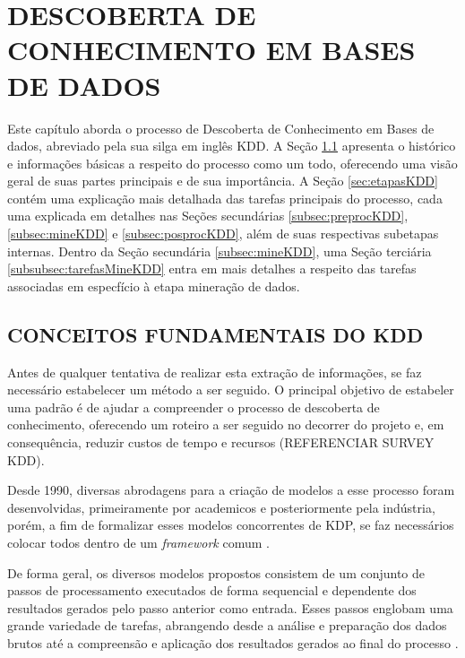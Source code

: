 
%

\chapter{DESCOBERTA DE CONHECIMENTO EM BASES DE DADOS}
\label{chap:descobertaConhecimento}
Este capítulo aborda o processo de Descoberta de Conhecimento em Bases de dados, abreviado pela sua silga em inglês KDD. A Seção \ref{sec:conceitosKDD} apresenta o histórico e informações básicas a respeito do processo como um todo, oferecendo uma visão geral de suas partes principais e de sua importância. A Seção \ref{sec:etapasKDD} contém uma explicação mais detalhada das tarefas principais do processo, cada uma explicada em detalhes nas Seções secundárias \ref{subsec:preprocKDD}, \ref{subsec:mineKDD} e \ref{subsec:posprocKDD}, além de suas respectivas subetapas internas. Dentro da Seção secundária \ref{subsec:mineKDD}, uma Seção terciária \ref{subsubsec:tarefasMineKDD} entra em mais detalhes a respeito das tarefas associadas em especfício à etapa mineração de dados.

\section{CONCEITOS FUNDAMENTAIS DO KDD}
\label{sec:conceitosKDD}

Antes de qualquer tentativa de realizar esta extração de informações, se faz necessário estabelecer um método a ser seguido. O principal objetivo de estabeler uma padrão é de ajudar a compreender o processo de descoberta de conhecimento, oferecendo um roteiro a ser seguido no decorrer do projeto e, em consequência, reduzir custos de tempo e recursos (REFERENCIAR SURVEY KDD).

Desde 1990, diversas abrodagens para a criação de modelos a esse processo foram desenvolvidas, primeiramente por academicos e posteriormente pela indústria, porém, a fim de formalizar esses modelos concorrentes de KDP, se faz necessários colocar todos dentro de um \textit{framework} comum .

De forma geral, os diversos modelos propostos consistem de um conjunto de passos de processamento executados de forma sequencial e dependente dos resultados gerados pelo passo anterior como entrada. Esses passos englobam uma grande variedade de tarefas, abrangendo desde a análise e preparação dos dados brutos até a compreensão e aplicação dos resultados gerados ao final do processo . 


